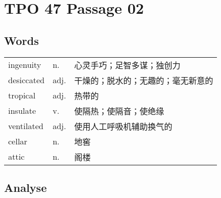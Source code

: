\section{TPO 47 Passage 02}

\subsection{Words}

\begin{tabular}{lll}
    ingenuity  & n.   & 心灵手巧；足智多谋；独创力     \\
    desiccated & adj. & 干燥的；脱水的；无趣的；毫无新意的 \\
    tropical   & adj. & 热带的               \\
    insulate   & v.   & 使隔热；使隔音；使绝缘       \\
    ventilated & adj. & 使用人工呼吸机辅助换气的      \\
    cellar     & n.   & 地窖                \\
    attic      & n.   & 阁楼                \\
\end{tabular}

\subsection{Analyse}

